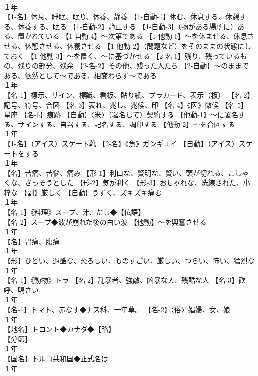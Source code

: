 \documentclass[8pt]{extreport}
\begin{document}
\begin{CJK}{UTF8}{min}
\\	１年	
\\	【1-名】休息、睡眠、眠り、休養、静養 【1-自動-1】休む、休息する、休憩する、休養する、眠る 【1-自動-2】静止する 【1-自動-3】（物がある場所に）ある、置かれている 【1-自動-4】～次第である 【1-他動-1】～を休ませる、休息させる、休憩させる、休養させる 【1-他動-2】（問題など）をそのままの状態にしておく 【1-他動-3】～を置く、～に基づかせる 【2-名-1】残り、残っているもの、残りの部分、残余 【2-名-2】その他、残った人たち 【2-自動】～のままである、依然として～である、相変わらず～である
\\	１年	
\\	【名-1】標示、サイン、標識、看板、貼り紙、プラカード、表示（板） 【名-2】記号、符号、合図 【名-3】表れ、兆し、兆候、印 【名-4】《医》徴候 【名-5】星座 【名-6】痕跡 【自動】〈米〉（署名して）契約する 【他動-1】～に署名する、サインする、自署する、記名する、調印する 【他動-2】～を合図する
\\	１年	
\\	【1-名】（アイス）スケート靴 【2-名】《魚》ガンギエイ 【自動】（アイス）スケートをする
\\	１年	
\\	【名】苦痛、苦悩、痛み 【形-1】利口な、賢明な、賢い、頭が切れる、こしゃくな、さっそうとした 【形-2】気が利く 【形-3】おしゃれな、洗練された、小粋な 【副】厳しく 【自動】うずく、ズキズキ痛む
\\	１年	
\\	【名-1】《料理》スープ、汁、だし◆【仏語】
\\	【名-2】スープ◆波が崩れた後の白い波 【他動】～を興奮させる
\\	１年	
\\	【名】胃痛、腹痛
\\	１年	
\\	【形】ひどい、過酷な、恐ろしい、ものすごい、厳しい、つらい、怖い、猛烈な
\\	１年	
\\	【名-1】《動物》トラ 【名-2】乱暴者、強敵、凶暴な人、残酷な人 【名-3】歓呼、喝さい
\\	１年	
\\	【名-1】トマト、赤なす◆ナス科、一年草。 【名-2】〈俗〉娼婦、女、娘
\\	１年	
\\	【地名】トロント◆カナダ◆【略】
\\	【分節】
\\	１年	
\\	【国名】トルコ共和国◆正式名は 
\\	１年	

\end{CJK}
\end{document}
